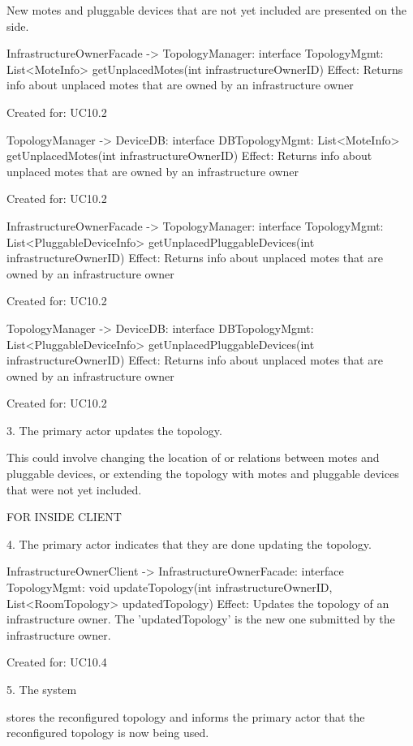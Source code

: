 {{{{           { New motes and pluggable devices that are not yet included are presented on the side.

            InfrastructureOwnerFacade -> TopologyManager: interface TopologyMgmt: List<MoteInfo> getUnplacedMotes(int infrastructureOwnerID)
               Effect: Returns info about unplaced motes that are owned by an infrastructure owner
               \item Created for: UC10.2

           TopologyManager -> DeviceDB: interface DBTopologyMgmt: List<MoteInfo> getUnplacedMotes(int infrastructureOwnerID)
               Effect: Returns info about unplaced motes that are owned by an infrastructure owner
               \item Created for: UC10.2

            InfrastructureOwnerFacade -> TopologyManager: interface TopologyMgmt: List<PluggableDeviceInfo> getUnplacedPluggableDevices(int infrastructureOwnerID)
               Effect: Returns info about unplaced motes that are owned by an infrastructure owner
               \item Created for: UC10.2

           TopologyManager -> DeviceDB: interface DBTopologyMgmt: List<PluggableDeviceInfo> getUnplacedPluggableDevices(int infrastructureOwnerID)
               Effect: Returns info about unplaced motes that are owned by an infrastructure owner
               \item Created for: UC10.2

        3. The primary actor updates the topology.
           { This could involve changing the location of or relations between motes and pluggable devices,
           or extending the topology with motes and pluggable devices that were not yet included.

           FOR INSIDE CLIENT

        4. The primary actor indicates that they are done updating the topology.

            InfrastructureOwnerClient -> InfrastructureOwnerFacade: interface TopologyMgmt: void updateTopology(int infrastructureOwnerID, List<RoomTopology> updatedTopology)
                Effect: Updates the topology of an infrastructure owner. The 'updatedTopology' is the new one submitted by the infrastructure owner.
                \item Created for: UC10.4

        5. The system
           { stores the reconfigured topology and informs the primary actor that the reconfigured topology is now being used.

}}}}}}}
